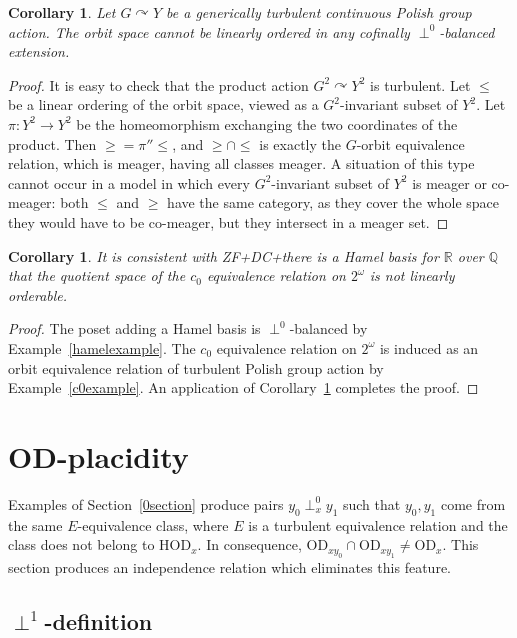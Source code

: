 \documentclass{article}
\newcommand{\gw}{\omega}
\newcommand{\cantor}{2^\gw}
\newcommand{\acts}{\curvearrowright}
\newcommand{\hvd}{\mathrm{HOD}}
\newcommand{\vd}{\mathrm{OD}}
\newtheorem{corollary}[theorem]{Corollary}
\theoremstyle{definition}
\begin{document}
\begin{corollary}
\label{linocorollary}
Let $G\acts Y$ be a generically turbulent continuous Polish group action.  The orbit space cannot be linearly ordered in any cofinally $\perp^0$-balanced extension.
\end{corollary}

\begin{proof}
It is easy to check that the product action $G^2\acts Y^2$ is turbulent. Let $\leq$ be a linear ordering of the orbit space, viewed as a $G^2$-invariant subset of $Y^2$. Let $\pi\colon Y^2\to Y^2$ be the homeomorphism exchanging the two coordinates of the product. Then $\geq=\pi''\leq$, and $\geq\cap\leq$ is exactly the $G$-orbit equivalence relation, which is meager, having all classes meager. A situation of this type cannot occur in a model in which every $G^2$-invariant subset of $Y^2$ is meager or co-meager: both $\leq$ and $\geq$ have the same category, as they cover the whole space they would have to be co-meager, but they intersect in a meager set.
\end{proof}

\begin{corollary}
It is consistent with ZF+DC+there is a Hamel basis for $\mathbb{R}$ over $\mathbb{Q}$ that the quotient space of the $c_0$ equivalence relation on $\cantor$ is not linearly orderable.
\end{corollary}

\begin{proof}
The poset adding a Hamel basis is $\perp^0$-balanced by Example~\ref{hamelexample}. The $c_0$ equivalence relation on $\cantor$ is induced as an orbit equivalence relation of turbulent Polish group action by Example~\ref{c0example}. An application of Corollary~\ref{linocorollary} completes the proof.
\end{proof}

\section{OD-placidity}
\label{1section}

Examples of Section~\ref{0section} produce pairs $y_0\perp^0_xy_1$ such that $y_0, y_1$ come from the same $E$-equivalence class, where $E$ is a turbulent equivalence relation and the class does not belong to $\hvd_x$. In consequence, $\vd_{xy_0}\cap\vd_{xy_1}\neq\vd_x$. This section produces an independence relation which eliminates this feature.

\subsection{$\perp^1$-definition}
\end{document}
